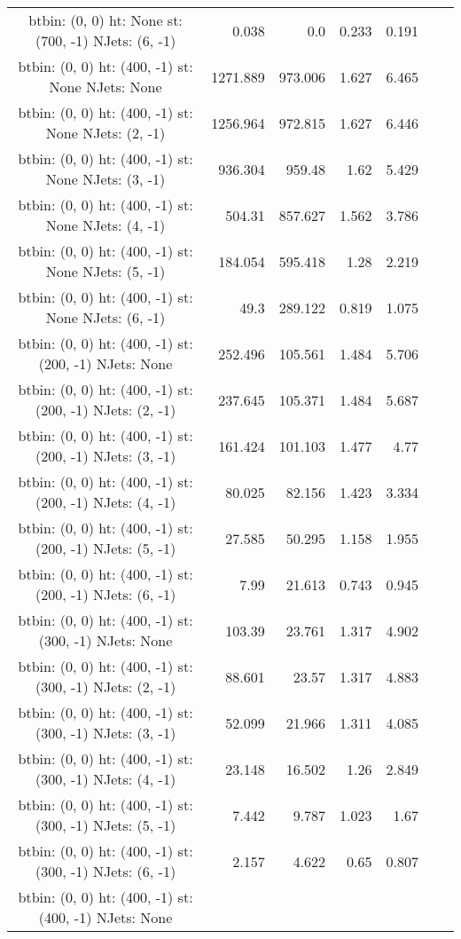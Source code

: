 \documentclass[12pt]{paper}
\begin{document}
\begin{landscape}
\begin{longtable}{c|r|r|r|r|r|r}
btbin:  (0, 0) ht:  None st:  (700, -1) NJets:  (6, -1)
 & 0.038 & 0.0 & 0.233 & 0.191\\
btbin:  (0, 0) ht:  (400, -1) st:  None NJets:  None
 & 1271.889 & 973.006 & 1.627 & 6.465\\
btbin:  (0, 0) ht:  (400, -1) st:  None NJets:  (2, -1)
 & 1256.964 & 972.815 & 1.627 & 6.446\\
btbin:  (0, 0) ht:  (400, -1) st:  None NJets:  (3, -1)
 & 936.304 & 959.48 & 1.62 & 5.429\\
btbin:  (0, 0) ht:  (400, -1) st:  None NJets:  (4, -1)
 & 504.31 & 857.627 & 1.562 & 3.786\\
btbin:  (0, 0) ht:  (400, -1) st:  None NJets:  (5, -1)
 & 184.054 & 595.418 & 1.28 & 2.219\\
btbin:  (0, 0) ht:  (400, -1) st:  None NJets:  (6, -1)
 & 49.3 & 289.122 & 0.819 & 1.075\\
btbin:  (0, 0) ht:  (400, -1) st:  (200, -1) NJets:  None
 & 252.496 & 105.561 & 1.484 & 5.706\\
btbin:  (0, 0) ht:  (400, -1) st:  (200, -1) NJets:  (2, -1)
 & 237.645 & 105.371 & 1.484 & 5.687\\
btbin:  (0, 0) ht:  (400, -1) st:  (200, -1) NJets:  (3, -1)
 & 161.424 & 101.103 & 1.477 & 4.77\\
btbin:  (0, 0) ht:  (400, -1) st:  (200, -1) NJets:  (4, -1)
 & 80.025 & 82.156 & 1.423 & 3.334\\
btbin:  (0, 0) ht:  (400, -1) st:  (200, -1) NJets:  (5, -1)
 & 27.585 & 50.295 & 1.158 & 1.955\\
btbin:  (0, 0) ht:  (400, -1) st:  (200, -1) NJets:  (6, -1)
 & 7.99 & 21.613 & 0.743 & 0.945\\
btbin:  (0, 0) ht:  (400, -1) st:  (300, -1) NJets:  None
 & 103.39 & 23.761 & 1.317 & 4.902\\
btbin:  (0, 0) ht:  (400, -1) st:  (300, -1) NJets:  (2, -1)
 & 88.601 & 23.57 & 1.317 & 4.883\\
btbin:  (0, 0) ht:  (400, -1) st:  (300, -1) NJets:  (3, -1)
 & 52.099 & 21.966 & 1.311 & 4.085\\
btbin:  (0, 0) ht:  (400, -1) st:  (300, -1) NJets:  (4, -1)
 & 23.148 & 16.502 & 1.26 & 2.849\\
btbin:  (0, 0) ht:  (400, -1) st:  (300, -1) NJets:  (5, -1)
 & 7.442 & 9.787 & 1.023 & 1.67\\
btbin:  (0, 0) ht:  (400, -1) st:  (300, -1) NJets:  (6, -1)
 & 2.157 & 4.622 & 0.65 & 0.807\\
btbin:  (0, 0) ht:  (400, -1) st:  (400, -1) NJets:  None

\end{longtable}
\end{landscape}
\end{document}
